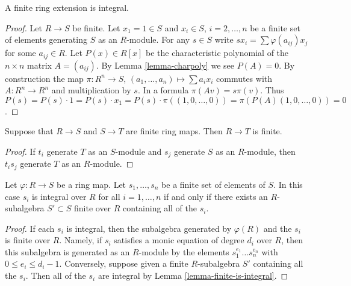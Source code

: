 \begin{lemma}
\label{lemma-finite-is-integral}
A finite ring extension is integral.
\end{lemma}

\begin{proof}
Let $R \to S$ be finite. Let $x_1 = 1 \in S$ and
$x_i \in S$, $i=2,\ldots,n$ be a finite set of
elements generating $S$ as an $R$-module.
For any $s\in S$ write $sx_i = \sum \varphi(a_{ij}) x_j$
for some $a_{ij} \in R$. Let $P(x) \in R[x]$ be
the characteristic polynomial of the $n\times n$ matrix
$A = (a_{ij})$. By Lemma \ref{lemma-charpoly} we see
$P(A) = 0$. By construction the map $\pi : R^n \to S$,
$(a_1,\ldots,a_n) \mapsto \sum a_i x_i$
commutes with $A : R^n \to R^n$ and
multiplication by $s$. In a formula
$\pi(Av) = s\pi(v)$. Thus $P(s) = P(s) \cdot 1
= P(s) \cdot x_1 = P(s) \cdot \pi((1,0,\ldots,0))
= \pi(P(A)(1,0,\ldots,0)) = 0$.
\end{proof}

\begin{lemma}
\label{lemma-finite-transitive}
Suppose that $R \to S$ and $S \to T$ are finite
ring maps. Then $R \to T$ is finite.
\end{lemma}

\begin{proof}
If $t_i$ generate $T$ as an $S$-module and $s_j$ generate $S$ as an
$R$-module, then $t_i s_j$ generate $T$ as an $R$-module.
\end{proof}

\begin{lemma}
\label{lemma-characterize-integral}
Let $\varphi : R \to S$ be a ring map. Let $s_1,\ldots,s_n$
be a finite set of elements of $S$.
In this case $s_i$ is integral over $R$ for all $i=1,\ldots,n$
if and only if
there exists an $R$-subalgebra $S' \subset S$ finite over $R$
containing all of the $s_i$.
\end{lemma}

\begin{proof}
If each $s_i$ is integral, then the subalgebra
generated by $\varphi(R)$ and the $s_i$ is finite
over $R$. Namely, if $s_i$ satisfies a monic equation
of degree $d_i$ over $R$, then this subalgebra is generated as an
$R$-module by the elements $s_1^{e_1} \ldots s_n^{e_n}$
with $0 \leq e_i \leq d_i - 1$.
Conversely, suppose given a finite $R$-subalgebra
$S'$ containing all the $s_i$. Then all of the
$s_i$ are integral by Lemma \ref{lemma-finite-is-integral}.
\end{proof}

